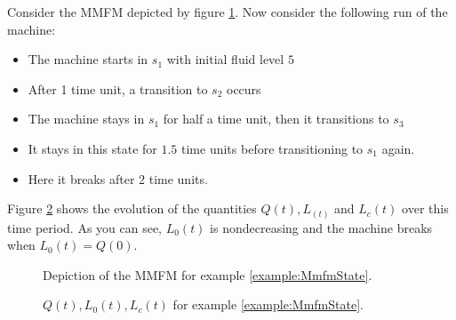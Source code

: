 \begin{example}\label{example:MmfmState}
	Consider the MMFM depicted by figure \ref{figure:MmfmExample}.
	Now consider the following run of the machine:
	\begin{itemize}
		\item The machine starts in $s_1$ with initial fluid level $5$
		\item After 1 time unit, a transition to $s_2$ occurs
		\item The machine stays in $s_1$ for half a time unit, then it transitions to $s_3$
		\item It stays in this state for $1.5$ time units before transitioning to $s_1$ again.
		\item Here it breaks after $2$ time units.
	\end{itemize}
	Figure \ref{figure:MmfmExampleQuantities} shows the evolution of the quantities $Q(t),L_(t)$ and $L_c(t)$ over this time period.
	As you can see, $L_0(t)$ is nondecreasing and the machine breaks when $L_0(t)=Q(0)$.
\end{example}
\begin{figure}\label{figure:MmfmExample}
\centering
{}
\caption{Depiction of the MMFM for example \ref{example:MmfmState}.}
\end{figure}
\begin{figure}[H]\label{figure:MmfmExampleQuantities}
\centering
\setlength{}

\caption{$Q(t),L_0(t),L_c(t)$ for example \ref{example:MmfmState}.}
\end{figure}

